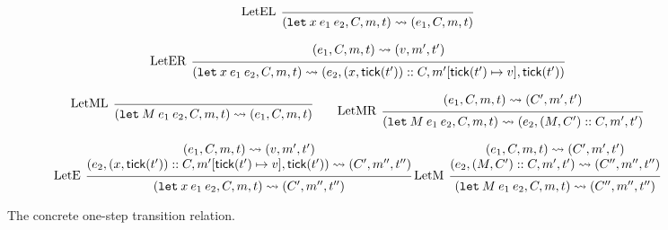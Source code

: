 \documentclass{article}
\theoremstyle{definition}
\newcommand*{\cons}{::}
\newcommand*{\mem}{m}
\newcommand*{\semarrow}{\rightsquigarrow}
\newcommand*{\tick}{\mathsf{tick}}
\begin{document}
\begin{figure}[h!]
  \[
    \begin{prooftree}
      \infer[left label=LetEL]0{
      (\mathtt{let}\:x\:e_1\:e_2, C, \mem, t)
      \semarrow
      (e_{1}, C, \mem, t)
      }
    \end{prooftree}
  \]

  \[
    \begin{prooftree}
      \hypo{
        \begin{matrix}
          (e_{1}, C, \mem, t)
          \semarrow
          (v, \mem', t')
        \end{matrix}
      }
      \infer[left label=LetER]1{
      (\mathtt{let}\:x\:e_1\:e_2, C, \mem, t)
      \semarrow
      (e_{2}, (x, \tick(t'))\cons C, \mem'[\tick(t')\mapsto v], \tick(t'))
      }
    \end{prooftree}
  \]

  \[
    \begin{prooftree}
      \infer[left label=LetML]0{
      (\mathtt{let}\:M\:e_{1}\:e_{2}, C, \mem, t)
      \semarrow
      (e_{1}, C, \mem, t)
      }
    \end{prooftree}\qquad
    \begin{prooftree}
      \hypo{
        \begin{matrix}
          (e_{1}, C, \mem, t)
          \semarrow
          (C', \mem', t')
        \end{matrix}
      }
      \infer[left label=LetMR]1{
      (\mathtt{let}\:M\:e_{1}\:e_{2}, C, \mem, t)
      \semarrow
      (e_{2}, (M, C')\cons C, \mem', t')
      }
    \end{prooftree}
  \]

  \[
    \begin{prooftree}
      \hypo{
        \begin{matrix}
          (e_{1}, C, \mem, t)
          \semarrow
          (v, \mem', t') \\
          (e_{2}, (x, \tick(t'))\cons C, \mem'[\tick(t')\mapsto v], \tick(t'))
          \semarrow
          (C', \mem'', t'')
        \end{matrix}
      }
      \infer[left label=LetE]1{
      (\mathtt{let}\:x\:e_1\:e_2, C, \mem, t)
      \semarrow
      (C', \mem'', t'')
      }
    \end{prooftree}\:
    \begin{prooftree}
      \hypo{
        \begin{matrix}
          (e_{1}, C, \mem, t)
          \semarrow
          (C', \mem', t') \\
          (e_{2}, (M, C')\cons C, \mem', t')
          \semarrow
          (C'', \mem'', t'')
        \end{matrix}
      }
      \infer[left label=LetM]1{
      (\mathtt{let}\:M\:e_{1}\:e_{2}, C, \mem, t)
      \semarrow
      (C'', \mem'', t'')
      }
    \end{prooftree}
  \]
  \caption{The concrete one-step transition relation.}
  \label{fig:concreach1}
\end{figure}
\end{document}
